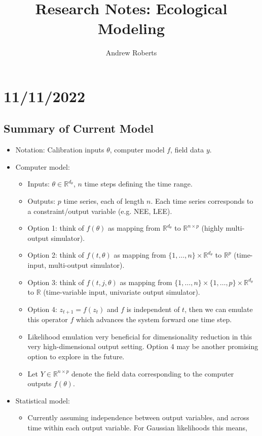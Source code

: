 \documentclass[12pt]{article}
\title{Research Notes: Ecological Modeling}
\author{Andrew Roberts}
\newcommand{\R}{\mathbb{R}}
\begin{document}
\maketitle
\tableofcontents
\newpage

\section{11/11/2022}

\subsection{Summary of Current Model}
\begin{itemize}
\item Notation: Calibration inputs $\theta$, computer model $f$, field data $y$.
\item Computer model: 
	\begin{itemize}
	\item Inputs: $\theta \in \R^{d_\theta}$, $n$ time steps defining the time range. 
	\item Outputs: $p$ time series, each of length $n$. Each time series corresponds to a constraint/output variable (e.g. NEE, LEE). 
	\item Option 1: think of $f(\theta)$ as mapping from $\R^{d_\theta}$ to $\R^{n \times p}$ (highly multi-output simulator).
	\item Option 2: think of $f(t, \theta)$ as mapping from $\{1, \dots, n\} \times \R^{d_\theta}$ to $\R^p$ (time-input, multi-output simulator).
	\item Option 3: think of $f(t, j, \theta)$ as mapping from $\{1, \dots, n\} \times \{1, \dots, p\} \times \R^{d_\theta}$ to $\R$ (time-variable input, univariate output simulator). 
	\item Option 4: $z_{t + 1} = f(z_t)$ and $f$ is independent of $t$, then we can emulate this operator $f$ which advances the system forward one time step.
	\item Likelihood emulation very beneficial for dimensionality reduction in this very high-dimensional output setting. Option 4 may be another promising option to explore in the future. 
	\item Let $Y \in \R^{n \times p}$ denote the field data corresponding to the computer outputs $f(\theta)$.
	\end{itemize}
\item Statistical model:
	\begin{itemize}
	\item Currently assuming independence between output variables, and across time within each output variable. For Gaussian likelihoods this means,

\end{itemize}
\end{itemize}
\end{document}
